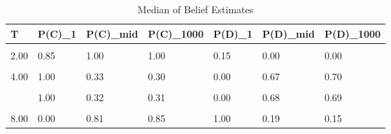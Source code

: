\begin{table}[!h]
\centering
\caption{Median of Belief Estimates}
\centering
\begin{tabular}[t]{lllllll}
\toprule
T & P(C)\_1 & P(C)\_mid & P(C)\_1000 & P(D)\_1 & P(D)\_mid & P(D)\_1000\\
\midrule
\cellcolor{gray!10}{1.00} & \cellcolor{gray!10}{1.00} & \cellcolor{gray!10}{1.00} & \cellcolor{gray!10}{1.00} & \cellcolor{gray!10}{0.00} & \cellcolor{gray!10}{0.00} & \cellcolor{gray!10}{0.00}\\
2.00 & 0.85 & 1.00 & 1.00 & 0.15 & 0.00 & 0.00\\
\cellcolor{gray!10}{3.00} & \cellcolor{gray!10}{0.98} & \cellcolor{gray!10}{0.00} & \cellcolor{gray!10}{0.00} & \cellcolor{gray!10}{0.02} & \cellcolor{gray!10}{1.00} & \cellcolor{gray!10}{1.00}\\
4.00 & 1.00 & 0.33 & 0.30 & 0.00 & 0.67 & 0.70\\
\cellcolor{gray!10}{5.00} & \cellcolor{gray!10}{1.00} & \cellcolor{gray!10}{0.30} & \cellcolor{gray!10}{0.30} & \cellcolor{gray!10}{0.00} & \cellcolor{gray!10}{0.70} & \cellcolor{gray!10}{0.70}\\
\addlinespace
6.00 & 1.00 & 0.32 & 0.31 & 0.00 & 0.68 & 0.69\\
\cellcolor{gray!10}{7.00} & \cellcolor{gray!10}{0.02} & \cellcolor{gray!10}{0.87} & \cellcolor{gray!10}{0.92} & \cellcolor{gray!10}{0.98} & \cellcolor{gray!10}{0.13} & \cellcolor{gray!10}{0.08}\\
8.00 & 0.00 & 0.81 & 0.85 & 1.00 & 0.19 & 0.15\\
\bottomrule
\end{tabular}
\end{table}